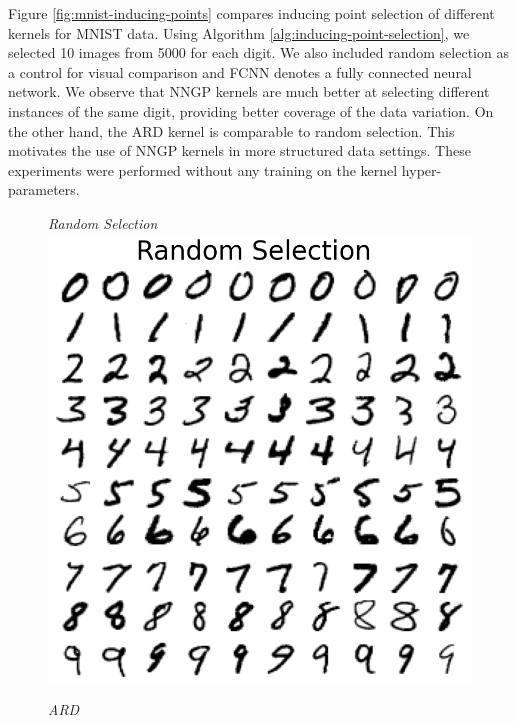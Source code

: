 \documentclass{article}
\numberwithin{equation}{section}
\begin{document}
Figure \ref{fig:mnist-inducing-points} compares inducing point selection of different kernels for MNIST data. 
Using Algorithm \ref{alg:inducing-point-selection}, we selected 10 images from 5000 for each digit.
We also included random selection as a control for visual comparison and FCNN denotes a fully connected neural network.
We observe that NNGP kernels are much better at selecting different instances of the same digit, providing better coverage of the data variation.
On the other hand, the ARD kernel is comparable to random selection. 
This motivates the use of NNGP kernels in more structured data settings.
These experiments were performed without any training on the kernel hyper-parameters.
\begin{figure}[h!]
\small
\centering
\begin{minipage}{.25\textwidth}
  \centering
  \textit{Random Selection}
  \includegraphics[width=\linewidth, trim={0 0 0 1.5cm},clip]{thesis-report/figures/mnist_inducing_point/random_mnist_inducing_point_selection.png}
\end{minipage}%
\begin{minipage}{.25\textwidth}
  \centering
  \textit{ARD}

\end{minipage}
\end{figure}
\end{document}
